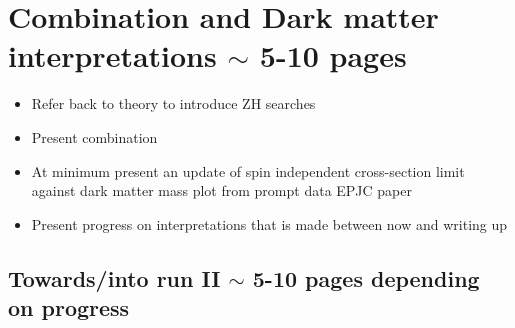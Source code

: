 \documentclass[12pt]{article}
\begin{document}
\section{Combination and Dark matter interpretations $\sim$ 5-10 pages}
\begin{itemize}
\label{sec:interpretations}
\item Refer back to theory to introduce ZH searches
\item Present combination
\item At minimum present an update of spin independent cross-section limit against dark matter mass plot from prompt data EPJC paper
\item Present progress on interpretations that is made between now and writing up
\end{itemize}

\subsection{Towards/into run II $\sim$ 5-10 pages depending on progress}
\label{sec:run2}
\end{document}
